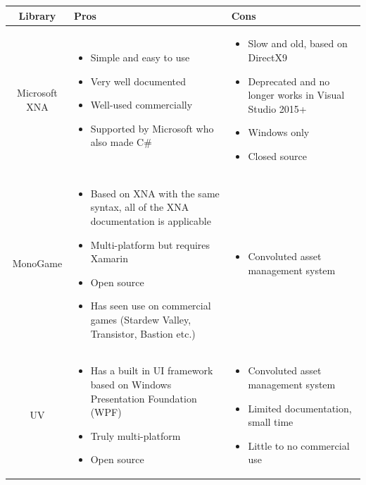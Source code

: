 \documentclass{ueacmpstyle}
\begin{document}
\begin{center}
	\begin{tabular}{c|p{}|p{}}
		Library & Pros & Cons \\ \hline
		Microsoft XNA & \begin{itemize}
			\item Simple and easy to use
			\item Very well documented
			\item Well-used commercially
			\item Supported by Microsoft who also made C\#
		\end{itemize} & \begin{itemize}
			\item Slow and old, based on DirectX9
			\item Deprecated and no longer works in Visual Studio 2015+
			\item Windows only
			\item Closed source
		\end{itemize} \\ \hline
		MonoGame & \begin{itemize}
			\item Based on XNA with the same syntax, all of the XNA documentation is applicable
			\item Multi-platform but requires Xamarin
			\item Open source
			\item Has seen use on commercial games (Stardew Valley, Transistor, Bastion etc.)
		\end{itemize} & \begin{itemize}
			\item Convoluted asset management system
		\end{itemize} \\ \hline
		UV & \begin{itemize}
			\item Has a built in UI framework based on Windows Presentation Foundation (WPF)
			\item Truly multi-platform
			\item Open source
		\end{itemize} & \begin{itemize}
			\item Convoluted asset management system
			\item Limited documentation, small time
			\item Little to no commercial use
		\end{itemize} \\ \hline

\end{tabular}
\end{center}
\end{document}
